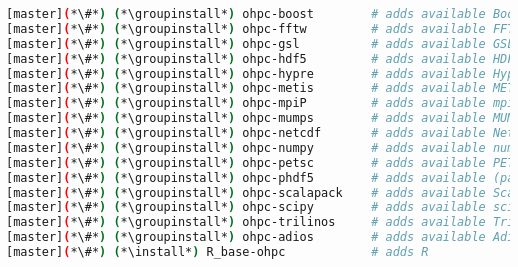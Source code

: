 \begin{lstlisting}[language=bash,keywords={},upquote=true,keepspaces]
[master](*\#*) (*\groupinstall*) ohpc-boost        # adds available Boost packages
[master](*\#*) (*\groupinstall*) ohpc-fftw         # adds available FFTW packages
[master](*\#*) (*\groupinstall*) ohpc-gsl          # adds available GSL packages
[master](*\#*) (*\groupinstall*) ohpc-hdf5         # adds available HDF5 packages
[master](*\#*) (*\groupinstall*) ohpc-hypre        # adds available Hypre packages
[master](*\#*) (*\groupinstall*) ohpc-metis        # adds available METIS packages
[master](*\#*) (*\groupinstall*) ohpc-mpiP         # adds available mpiP packages
[master](*\#*) (*\groupinstall*) ohpc-mumps        # adds available MUMPS packages
[master](*\#*) (*\groupinstall*) ohpc-netcdf       # adds available NetCDF packages
[master](*\#*) (*\groupinstall*) ohpc-numpy        # adds available numerical Python packages
[master](*\#*) (*\groupinstall*) ohpc-petsc        # adds available PETSC packages
[master](*\#*) (*\groupinstall*) ohpc-phdf5        # adds available (parallel) HDF5 packages
[master](*\#*) (*\groupinstall*) ohpc-scalapack    # adds available ScaLAPACK packages
[master](*\#*) (*\groupinstall*) ohpc-scipy        # adds available scientific Python packages
[master](*\#*) (*\groupinstall*) ohpc-trilinos     # adds available Trilinos packages
[master](*\#*) (*\groupinstall*) ohpc-adios        # adds available Adios packages
[master](*\#*) (*\install*) R_base-ohpc            # adds R
\end{lstlisting}
